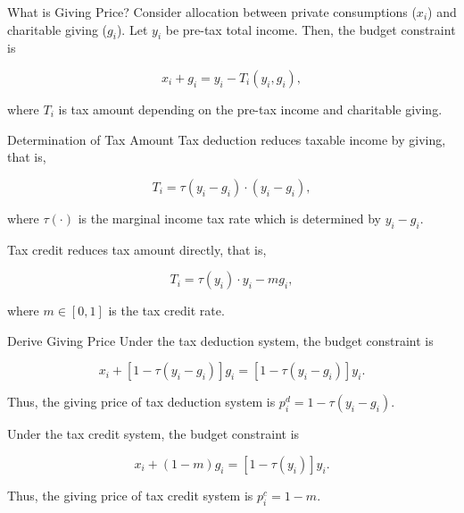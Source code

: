 \documentclass[
  ignorenonframetext,
]{beamer}
\begin{document}
\begin{frame}{What is Giving Price?}
\protect\hypertarget{what-is-giving-price}{}
Consider allocation between private consumptions (\(x_i\)) and
charitable giving (\(g_i\)). Let \(y_i\) be pre-tax total income. Then,
the budget constraint is

\[
    x_i + g_i = y_i - T_i(y_i, g_i),
\]

where \(T_i\) is tax amount depending on the pre-tax income and
charitable giving.
\end{frame}

\begin{frame}{Determination of Tax Amount}
\protect\hypertarget{determination-of-tax-amount}{}
Tax deduction reduces taxable income by giving, that is,

\[
    T_i = \tau(y_i - g_i) \cdot (y_i - g_i),
\]

where \(\tau(\cdot)\) is the marginal income tax rate which is
determined by \(y_i - g_i\).

Tax credit reduces tax amount directly, that is,

\[
    T_i = \tau(y_i)\cdot y_i - m g_i,
\]

where \(m \in [0, 1]\) is the tax credit rate.
\end{frame}

\begin{frame}{Derive Giving Price}
\protect\hypertarget{derive-giving-price}{}
Under the tax deduction system, the budget constraint is

\[
    x_i + [1 - \tau(y_i - g_i)]g_i = [1 - \tau(y_i - g_i)] y_i.
\]

Thus, the giving price of tax deduction system is
\(p_i^{d} = 1 - \tau(y_i - g_i)\).

Under the tax credit system, the budget constraint is

\[
    x_i + (1 - m) g_i = [1 - \tau(y_i)] y_i.
\]

Thus, the giving price of tax credit system is \(p_i^c = 1 - m\).
\end{frame}
\end{document}
